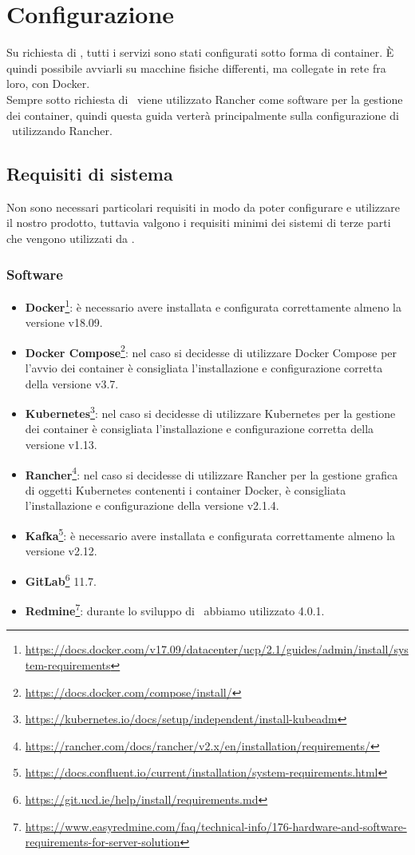 \section{Configurazione}\label{configurazione}

Su richiesta di \II, tutti i servizi sono stati configurati sotto forma di container. È quindi possibile avviarli su macchine fisiche differenti, ma collegate in rete fra loro, con Docker.\\
Sempre sotto richiesta di \II\ viene utilizzato Rancher come software per la gestione dei container, quindi questa guida verterà principalmente sulla configurazione di \progetto\ utilizzando Rancher. %

\subsection{Requisiti di sistema}

	Non sono necessari particolari requisiti in modo da poter configurare e utilizzare il nostro prodotto, tuttavia valgono i requisiti minimi dei sistemi di terze parti che vengono utilizzati da \progetto.

	\subsubsection{Software}
		\begin{itemize}
			\item \textbf{Docker}\footnote{\url{https://docs.docker.com/v17.09/datacenter/ucp/2.1/guides/admin/install/system-requirements}}: è necessario avere installata e configurata correttamente almeno la versione v18.09.
			\item \textbf{Docker Compose}\footnote{\url{https://docs.docker.com/compose/install/}}:  nel caso si decidesse di utilizzare Docker Compose per l'avvio dei container è consigliata l'installazione e configurazione corretta della versione v3.7.
			\item \textbf{Kubernetes}\footnote{\url{https://kubernetes.io/docs/setup/independent/install-kubeadm}}: nel caso si decidesse di utilizzare Kubernetes per la gestione dei container è consigliata l'installazione e configurazione corretta della versione v1.13.
			\item \textbf{Rancher}\footnote{\url{https://rancher.com/docs/rancher/v2.x/en/installation/requirements/}}: nel caso si decidesse di utilizzare Rancher per la gestione grafica di oggetti Kubernetes contenenti i container Docker, è consigliata l'installazione e configurazione della versione v2.1.4.
			\item \textbf{Kafka}\footnote{\url{https://docs.confluent.io/current/installation/system-requirements.html}}: è necessario avere installata e configurata correttamente almeno la versione v2.12.
			\item \textbf{GitLab}\footnote{\url{https://git.ucd.ie/help/install/requirements.md}} 11.7.
			\item \textbf{Redmine}\footnote{%
			\url{https://www.easyredmine.com/faq/technical-info/176-hardware-and-software-requirements-for-server-solution}}: durante lo sviluppo di \progetto\ abbiamo utilizzato 4.0.1.
		\end{itemize}


